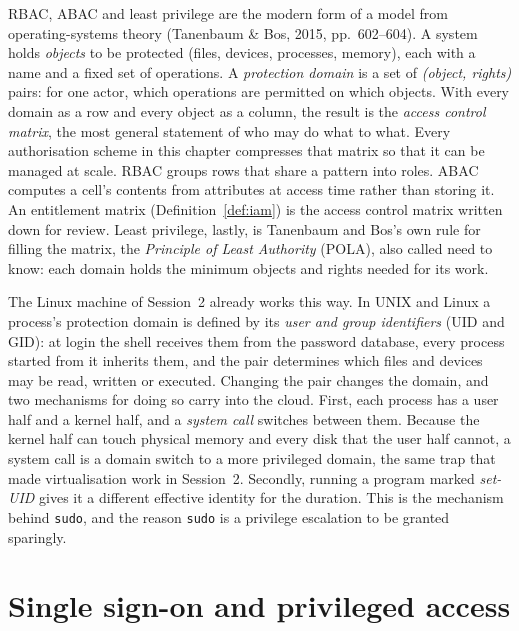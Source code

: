 RBAC, ABAC and least privilege are the modern form of a model from
operating-systems theory (Tanenbaum \& Bos, 2015, pp.~602--604). A system
holds \emph{objects} to be protected (files, devices, processes, memory),
each with a name and a fixed set of operations. A \emph{protection domain}
is a set of \emph{(object, rights)} pairs: for one actor, which operations
are permitted on which objects. With every domain as a row and every object
as a column, the result is the \emph{access control matrix}, the most
general statement of who may do what to what. Every authorisation scheme in
this chapter compresses that matrix so that it can be managed at scale. RBAC
groups rows that share a pattern into roles. ABAC computes a cell's contents
from attributes at access time rather than storing it. An entitlement matrix
(Definition~\ref{def:iam}) is the access control matrix written down for
review. Least privilege, lastly, is Tanenbaum and Bos's own rule for filling
the matrix, the \emph{Principle of Least Authority} (POLA), also called need
to know: each domain holds the minimum objects and rights needed for its
work.

The Linux machine of Session~2 already works this way. In UNIX and Linux a
process's protection domain is defined by its \emph{user and group
identifiers} (UID and GID): at login the shell receives them from the
password database, every process started from it inherits them, and the
pair determines which files and devices may be read, written or executed.
Changing the pair changes the domain, and two mechanisms for doing so carry
into the cloud. First, each process has a user half and a kernel half, and a
\emph{system call} switches between them. Because the kernel half can touch
physical memory and every disk that the user half cannot, a system call is a
domain switch to a more privileged domain, the same trap that made
virtualisation work in Session~2. Secondly, running a program marked
\emph{set-UID} gives it a different effective identity for the duration.
This is the mechanism behind \texttt{sudo}, and the reason \texttt{sudo} is
a privilege escalation to be granted sparingly.

\section{Single sign-on and privileged access}

